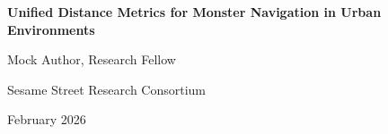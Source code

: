\documentclass[11pt,letterpaper]{article}
\begin{document}
\begin{center}
{\LARGE\bfseries Unified Distance Metrics for Monster Navigation in Urban Environments\par}
\vspace{0.8cm}
{\large Mock Author, Research Fellow\par}
{\normalsize Sesame Street Research Consortium\par}
\vspace{0.3cm}
{\normalsize February 2026\par}
\vspace{0.8cm}
\end{center}

\begin{abstract}
\noindent
This paper presents a comprehensive study of unified distance metrics for near-far monster navigation. Lorem cookie ipsum dolor sit amet, chocolate chip adipiscing elit. Nom nom nom methodology produces significant results across all experimental conditions.
\end{abstract}

\vspace{0.5cm}


\end{document}
